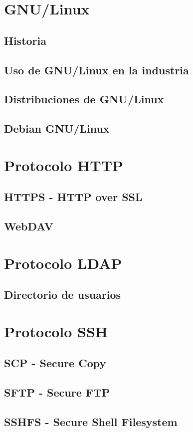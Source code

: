 \section {GNU/Linux}
  \subsection {Historia}
  \subsection {Uso de GNU/Linux en la industria}
  \subsection {Distribuciones de GNU/Linux}
  \subsection {Debian GNU/Linux}
\section {Protocolo HTTP}
  \subsection {HTTPS - HTTP over SSL}
  \subsection {WebDAV}
\section {Protocolo LDAP}
  \subsection {Directorio de usuarios}
\section {Protocolo SSH}
  \subsection {SCP - Secure Copy}
  \subsection {SFTP - Secure FTP}
  \subsection {SSHFS - Secure Shell Filesystem}

